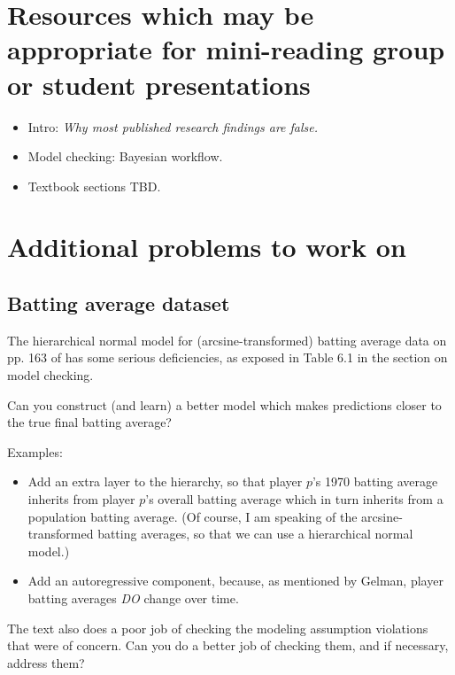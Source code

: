 \documentclass{article} %
\begin{document}
{}



\appendix

\section{Resources which may be appropriate for mini-reading group or student presentations}

\begin{itemize}
\item Intro: \textit{Why most published research findings are false. } \cite{ioannidis2005most}
\item Model checking: Bayesian workflow.
\item Textbook sections TBD. 
\end{itemize}

\section{Additional problems to work on}

\subsection{Batting average dataset}

The hierarchical normal model for (arcsine-transformed) batting average data on pp.  163 of \cite{gelman2013bayesian} has some serious deficiencies,  as exposed in Table 6.1 in the section on model checking.    

Can you construct (and learn) a better model which makes predictions closer to the true final batting average?
 
Examples:
\begin{itemize}
\item Add an extra layer to the hierarchy,  so that player $p$'s 1970 batting average inherits from player $p$'s overall batting average which in turn inherits from a population batting average.  (Of course,  I am speaking of the arcsine-transformed batting averages,  so that we can use a hierarchical normal model.)
\item Add an autoregressive component, because,  as mentioned by Gelman,  player batting averages \textit{DO} change over time. 
\end{itemize}

The text also does a poor job of checking the modeling assumption violations that were of concern.   Can you do a better job of checking them,  and if necessary,  address them?
\end{document}

